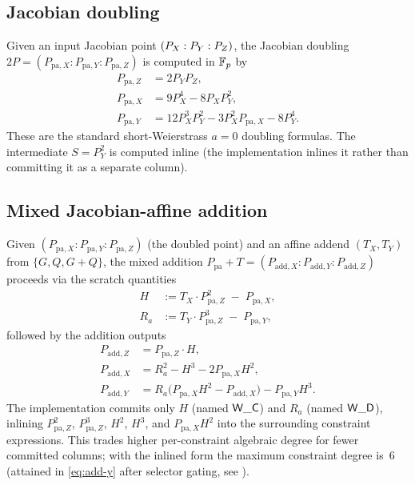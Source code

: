 \subsection{Jacobian doubling}\label{sec:doubling}

Given an input Jacobian point $(P_X : P_Y : P_Z)$, the Jacobian doubling
$2P = (P_{\mathrm{pa},X} : P_{\mathrm{pa},Y} : P_{\mathrm{pa},Z})$ is
computed in $\mathbb{F}_p$ by
\begin{align}
P_{\mathrm{pa},Z} &= 2 P_Y P_Z, \label{eq:dbl-z}\\
P_{\mathrm{pa},X} &= 9 P_X^4 - 8 P_X P_Y^2, \label{eq:dbl-x}\\
P_{\mathrm{pa},Y} &= 12 P_X^3 P_Y^2 - 3 P_X^2 P_{\mathrm{pa},X} - 8 P_Y^4. \label{eq:dbl-y}
\end{align}
These are the standard short-Weierstrass $a = 0$ doubling formulas.
The intermediate $S = P_Y^2$ is computed inline (the implementation
inlines it rather than committing it as a separate column).

\subsection{Mixed Jacobian-affine addition}\label{sec:add}

Given $(P_{\mathrm{pa},X} : P_{\mathrm{pa},Y} : P_{\mathrm{pa},Z})$
(the doubled point) and an affine addend $(T_X, T_Y)$ from 
 $\{G, Q, G+Q\}$, the mixed addition
$P_{\mathrm{pa}} + T = (P_{\mathrm{add},X} : P_{\mathrm{add},Y} : P_{\mathrm{add},Z})$
proceeds via the scratch
quantities
\begin{align}
H   &:= T_X \cdot P_{\mathrm{pa},Z}^2 \;-\; P_{\mathrm{pa},X}, \label{eq:H}\\
R_a &:= T_Y \cdot P_{\mathrm{pa},Z}^3 \;-\; P_{\mathrm{pa},Y}, \label{eq:Ra}
\end{align}
followed by the addition outputs
\begin{align}
P_{\mathrm{add},Z} &= P_{\mathrm{pa},Z} \cdot H, \label{eq:add-z}\\
P_{\mathrm{add},X} &= R_a^2 - H^3 - 2 P_{\mathrm{pa},X} H^2, \label{eq:add-x}\\
P_{\mathrm{add},Y} &= R_a \bigl(P_{\mathrm{pa},X} H^2 - P_{\mathrm{add},X}\bigr) - P_{\mathrm{pa},Y} H^3. \label{eq:add-y}
\end{align}
The implementation commits only $H$ (named $\mathsf{W\_C}$) and $R_a$
(named $\mathsf{W\_D}$), inlining $P_{\mathrm{pa},Z}^2$, $P_{\mathrm{pa},Z}^3$,
$H^2$, $H^3$, and $P_{\mathrm{pa},X} H^2$ into the surrounding
constraint expressions. This trades higher per-constraint algebraic
degree for fewer committed columns; with the inlined form the maximum
constraint degree is~$6$ (attained in \eqref{eq:add-y} after
selector gating, see ).

